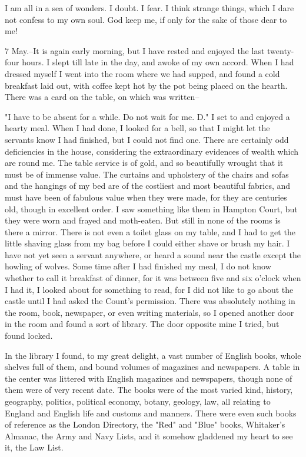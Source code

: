 I am all in a sea of wonders. I doubt. I fear. I think strange things, which I dare not confess to my own soul. God keep me, if only for the sake of those dear to me! 

7 May.--It is again early morning, but I have rested and enjoyed the last twenty-four hours. I slept till late in the day, and awoke of my own accord. When I had dressed myself I went into the room where we had supped, and found a cold breakfast laid out, with coffee kept hot by the pot being placed on the hearth. There was a card on the table, on which was written-- 

"I have to be absent for a while. Do not wait for me. D." I set to and enjoyed a hearty meal. When I had done, I looked for a bell, so that I might let the servants know I had finished, but I could not find one. There are certainly odd deficiencies in the house, considering the extraordinary evidences of wealth which are round me. The table service is of gold, and so beautifully wrought that it must be of immense value. The curtains and upholstery of the chairs and sofas and the hangings of my bed are of the costliest and most beautiful fabrics, and must have been of fabulous value when they were made, for they are centuries old, though in excellent order. I saw something like them in Hampton Court, but they were worn and frayed and moth-eaten. But still in none of the rooms is there a mirror. There is not even a toilet glass on my table, and I had to get the little shaving glass from my bag before I could either shave or brush my hair. I have not yet seen a servant anywhere, or heard a sound near the castle except the howling of wolves. Some time after I had finished my meal, I do not know whether to call it breakfast of dinner, for it was between five and six o'clock when I had it, I looked about for something to read, for I did not like to go about the castle until I had asked the Count's permission. There was absolutely nothing in the room, book, newspaper, or even writing materials, so I opened another door in the room and found a sort of library. The door opposite mine I tried, but found locked. 

In the library I found, to my great delight, a vast number of English books, whole shelves full of them, and bound volumes of magazines and newspapers. A table in the center was littered with English magazines and newspapers, though none of them were of very recent date. The books were of the most varied kind, history, geography, politics, political economy, botany, geology, law, all relating to England and English life and customs and manners. There were even such books of reference as the London Directory, the "Red" and "Blue" books, Whitaker's Almanac, the Army and Navy Lists, and it somehow gladdened my heart to see it, the Law List. 

